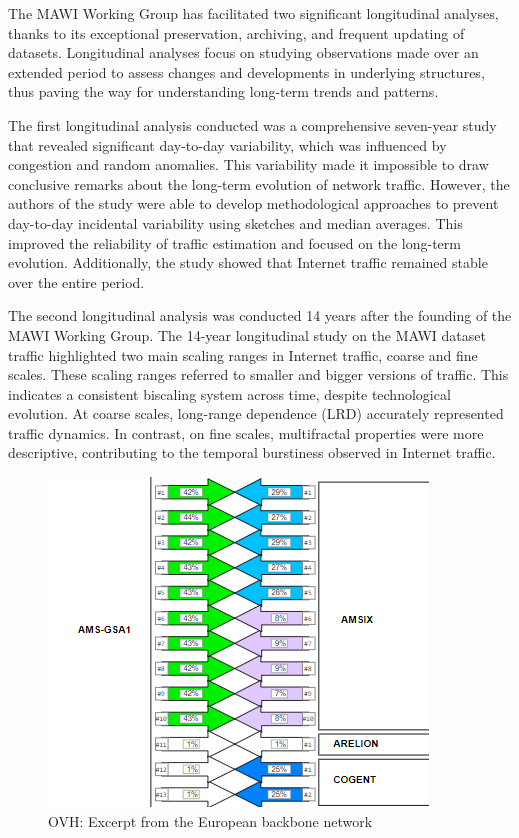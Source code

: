 \documentclass[sigconf,authorversion,nonacm]{acmart}
\begin{document}
The MAWI Working Group has facilitated two significant longitudinal analyses, thanks to its exceptional preservation, archiving, and frequent updating of datasets. Longitudinal analyses focus on studying observations made over an extended period to assess changes and developments in underlying structures, thus paving the way for understanding long-term trends and patterns.

The first longitudinal analysis \cite{5061979} conducted was a comprehensive seven-year study that revealed significant day-to-day variability, which was influenced by congestion and random anomalies. This variability made it impossible to draw conclusive remarks about the long-term evolution of network traffic. However, the authors of the study were able to develop methodological approaches to prevent day-to-day incidental variability using sketches and median averages. This improved the reliability of traffic estimation and focused on the long-term evolution. Additionally, the study showed that Internet traffic remained stable over the entire period.

The second longitudinal analysis \cite{7878657} was conducted 14 years after the founding of the MAWI Working Group. The 14-year longitudinal study on the MAWI dataset traffic highlighted two main scaling ranges in Internet traffic, coarse and fine scales. These scaling ranges referred to smaller and bigger versions of traffic. This indicates a consistent biscaling system across time, despite technological evolution. At coarse scales, long-range dependence (LRD) accurately represented traffic dynamics. In contrast, on fine scales, multifractal properties were more descriptive, contributing to the temporal burstiness observed in Internet traffic.

\begin{figure}
    \centering
    \includegraphics[width=\linewidth]{OVH/ovh.png}
    \caption{OVH: Excerpt from the European backbone network}
    \label{OVH: Excerpt from the European backbone network}
\end{figure}
\end{document}
